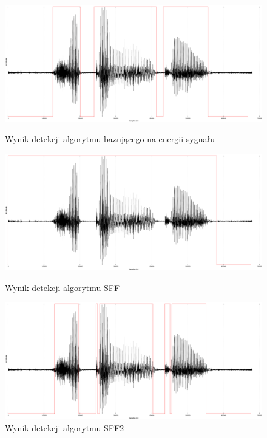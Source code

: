 \documentclass[eng,printmode]{mgr}
\begin{document}
	 
	 \begin{figure}
	 	\begin{center}
	 		\includegraphics[scale=0.2]{zapamietajEnergy.png}
	 		\caption{Wynik detekcji algorytmu bazującego na energii sygnału}\vspace{5mm}
	 		
	 		\includegraphics[scale=0.2]{zapamietajSFFArticle.png}
	 		\caption{Wynik detekcji algorytmu SFF}\vspace{5mm}
	 		
	 		\includegraphics[scale=0.2]{zapamietajSFFChanged.png}
	 		\caption{Wynik detekcji algorytmu SFF2}\vspace{5mm}
	 	\end{center}
	 \end{figure}
	 
\end{document}
